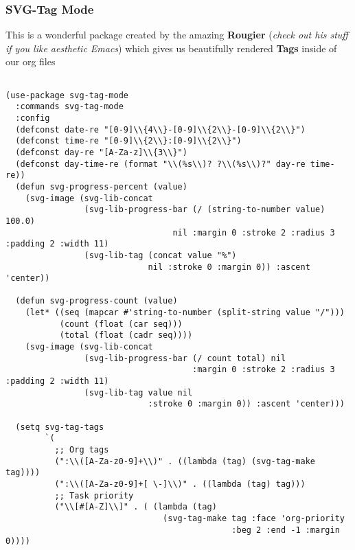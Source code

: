 \documentclass[11pt]{article}
\begin{document}
\subsubsection{SVG-Tag Mode}
\label{sec:orgf74e78a}
This is a wonderful package created by the amazing \textbf{Rougier} (\emph{check out his stuff if you like aesthetic Emacs}) which gives us beautifully rendered \textbf{Tags} inside of our org files
\begin{verbatim}

(use-package svg-tag-mode
  :commands svg-tag-mode
  :config
  (defconst date-re "[0-9]\\{4\\}-[0-9]\\{2\\}-[0-9]\\{2\\}")
  (defconst time-re "[0-9]\\{2\\}:[0-9]\\{2\\}")
  (defconst day-re "[A-Za-z]\\{3\\}")
  (defconst day-time-re (format "\\(%s\\)? ?\\(%s\\)?" day-re time-re))
  (defun svg-progress-percent (value)
    (svg-image (svg-lib-concat
                (svg-lib-progress-bar (/ (string-to-number value) 100.0)
                                  nil :margin 0 :stroke 2 :radius 3 :padding 2 :width 11)
                (svg-lib-tag (concat value "%")
                             nil :stroke 0 :margin 0)) :ascent 'center))

  (defun svg-progress-count (value)
    (let* ((seq (mapcar #'string-to-number (split-string value "/")))
           (count (float (car seq)))
           (total (float (cadr seq))))
    (svg-image (svg-lib-concat
                (svg-lib-progress-bar (/ count total) nil
                                      :margin 0 :stroke 2 :radius 3 :padding 2 :width 11)
                (svg-lib-tag value nil
                             :stroke 0 :margin 0)) :ascent 'center)))

  (setq svg-tag-tags
        `(
          ;; Org tags
          (":\\([A-Za-z0-9]+\\)" . ((lambda (tag) (svg-tag-make tag))))
          (":\\([A-Za-z0-9]+[ \-]\\)" . ((lambda (tag) tag)))
          ;; Task priority
          ("\\[#[A-Z]\\]" . ( (lambda (tag)
                                (svg-tag-make tag :face 'org-priority
                                              :beg 2 :end -1 :margin 0))))


\end{verbatim}
\end{document}
